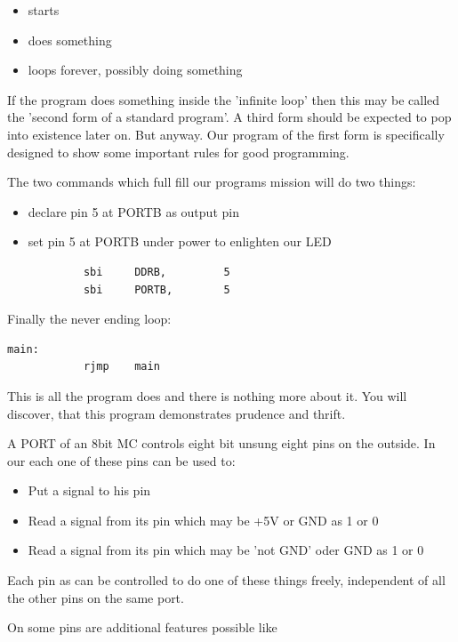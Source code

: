 \begin{itemize}
  \item  starts
  \item  does something
  \item  loops forever, possibly doing something
\end{itemize}

If the program does something inside the 'infinite loop' then this may be called the 'second form of a standard program'. A third form should be expected to pop into existence later on. But anyway. Our program of the first form is specifically designed to show some important rules for good programming.

The two commands which full fill our programs mission will do two things:

\begin{itemize}
  \item  declare pin 5 at PORTB as output pin
  \item  set pin 5 at PORTB under power to enlighten our LED
\end{itemize}

\begin{lstlisting}
            sbi     DDRB,         5
            sbi     PORTB,        5
\end{lstlisting}

Finally the never ending loop:

\begin{lstlisting}
main:
            rjmp    main
\end{lstlisting}

This is all the program does and there is nothing more about it. You will discover, that this program demonstrates prudence and thrift. 

A PORT of an 8bit MC controls eight bit unsung eight pins on the outside. In our \at each one of these pins can be used to:

\begin{itemize}
  \item Put a signal to his pin
  \item Read a signal from its pin which may be +5V or GND as 1 or 0
  \item Read a signal from its pin which may be 'not GND' oder GND as 1 or 0
\end{itemize}

Each pin as can be controlled to do one of these things freely, independent of all the other pins on the same port.

On some pins are additional features possible like

